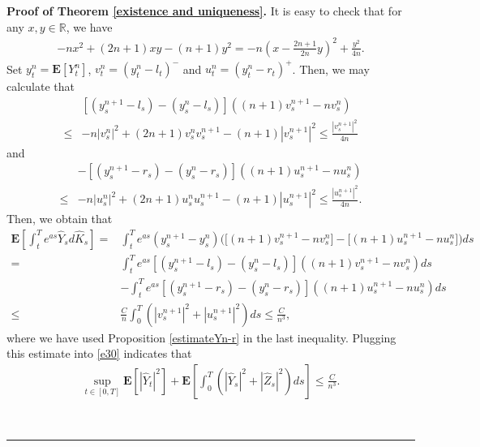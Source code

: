 \documentclass[10pt]{article}%
\numberwithin{equation}{section}
\newenvironment{proof}[1][Proof]{\noindent \textbf{#1.} }{\  \rule{0.5em}{0.5em}}
\def \E{\mathbf{E}}
\begin{document}
\begin{proof}[Proof of Theorem \ref{existence and uniqueness}]
It is easy to check that for any $x,y\in\mathbb{R}$, we have
\begin{align*}
-nx^2+(2n+1)xy-(n+1)y^2=-n(x-\frac{2n+1}{2n}y)^2+\frac{y^2}{4n}.
\end{align*}
Set $y^n_t=\E[Y^n_t]$, $v^n_t=(y^n_t-l_t)^-$ and $u^n_t=(y_t^n-r_t)^+$. Then, we may calculate that
\begin{align*}%
&[(y^{n+1}_s-l_s)-(y^n_s-l_s)]((n+1)v_s^{n+1}-nv_s^n)\\
\leq&-n|v_s^n|^2+(2n+1)v^n_s v^{n+1}_s-(n+1)|v_s^{n+1}|^2\leq \frac{|v^{n+1}_s|^2}{4n}
\end{align*}%
and
\begin{align*}%
&-[(y^{n+1}_s-r_s)-(y^n_s-r_s)]((n+1)u_s^{n+1}-nu_s^n)\\
\leq&-n|u_s^n|^2+(2n+1)u^n_s u^{n+1}_s-(n+1)|u_s^{n+1}|^2\leq \frac{|u^{n+1}_s|^2}{4n}.
\end{align*}%
Then, we obtain that
\begin{equation}\label{eq1.81}\begin{split}
\E\left[\int_t^T e^{as}\hat{Y}_sd\hat{K}_s\right]=&\int_t^T e^{as}(y^{n+1}_s-y_s^n)\bigg(\big[(n+1)v_s^{n+1}-nv_s^n\big]-\big[(n+1)u_s^{n+1}-nu_s^n\big]\bigg)ds\\
 =&\int_t^T e^{as}\left[(y^{n+1}_s-l_s)-(y^n_s-l_s)\right]((n+1)v_s^{n+1}-nv_s^n)ds\\
 &-\int_t^T e^{as}\left[(y^{n+1}_s-r_s)-(y^n_s-r_s)\right]((n+1)u_s^{n+1}-nu_s^n)ds\\
 \leq &\frac{C}{n}\int_0^T \left(|v^{n+1}_s|^2+|u^{n+1}_s|^2\right)ds\leq \frac{C}{n^3},
\end{split}\end{equation}
where we have used Proposition \ref{estimateYn-r} in the last inequality. 
Plugging this estimate into \eqref{e30} indicates that
\begin{align}\label{eq1.84}
\sup_{t\in[0,T]}\E[|\hat{Y}_t|^2]+\E\left[\int_0^T \left(|\hat{Y}_s|^2+|\hat{Z}_s|^2\right)ds\right]\leq \frac{C}{n^3}.
\end{align}

\end{proof}
\end{document}
